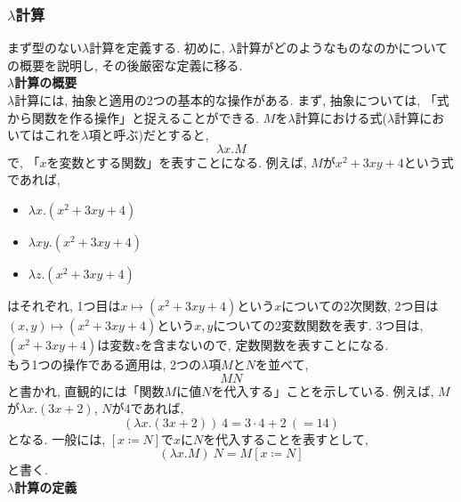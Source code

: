 \documentclass[11pt]{jarticle}
\theoremstyle{mystyle}
\newcommand{\0}{\textbf{0}}
\newcommand{\1}{\textbf{1}}
\newcommand{\2}{\textbf{2}}
\begin{document}
\subsubsection{$\lambda$計算} \label{sssec lambdacal}
まず型のない$\lambda$計算を定義する. 初めに, $\lambda$計算がどのようなものなのかについての概要を説明し, その後厳密な定義に移る. \\
\textbf{$\lambda$計算の概要}\\
$\lambda$計算には, 抽象と適用の2つの基本的な操作がある. まず, 抽象については, 「式から関数を作る操作」と捉えることができる. $M$を$\lambda$計算における式($\lambda$計算においてはこれを$\lambda$項と呼ぶ)だとすると, 
\[
  \lambda x . M
\]
で, 「$x$を変数とする関数」を表すことになる. 
例えば, $M$が$x^2 + 3xy + 4$という式であれば, 
\begin{itemize}
  \item $\lambda x . (x^2 + 3xy + 4)$
  \item $\lambda xy . (x^2 + 3xy + 4)$
  \item $\lambda z . (x^2 + 3xy + 4)$
\end{itemize}
はそれぞれ, 1つ目は$x \mapsto (x^2 + 3xy + 4)$という$x$についての2次関数, 
2つ目は$(x, y) \mapsto (x^2 + 3xy + 4)$という$x, y$についての2変数関数を表す. 
3つ目は, $(x^2 + 3xy + 4)$は変数$z$を含まないので, 定数関数を表すことになる. \\
もう1つの操作である適用は, 2つの$\lambda$項$M$と$N$を並べて, 
\[
  MN
\]
と書かれ, 直観的には「関数$M$に値$N$を代入する」ことを示している. 
例えば, $M$が$\lambda x . (3x + 2)$, $N$が$4$であれば, 
\[
  (\lambda x . (3x + 2))\ 4 = 3 \cdot 4 + 2\ (= 14)
\]
となる. 一般には, $[x \coloneqq N]$で$x$に$N$を代入することを表すとして, 
\[
  (\lambda x. M)\ N = M[x\coloneqq N]
\]
と書く. \\
\textbf{{$\lambda$計算の定義}}
\end{document}
